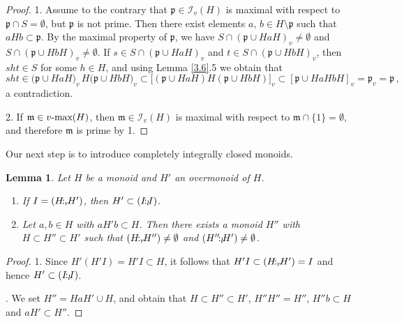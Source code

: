 \documentclass[a4paper]{amsart}
\newtheorem{lemma}[theorem]{Lemma}
\theoremstyle{definition}
\numberwithin{equation}{section}
\begin{document}
\begin{proof}
1. Assume to the contrary that $\mathfrak p \in \mathcal I_v(H)$ is
maximal with respect to $\mathfrak p \cap S = \emptyset$, but
$\mathfrak p$ is not prime. Then there exist elements $a,\,b \in H
\setminus \mathfrak p$ such that $aHb \subset \mathfrak p$. By the
maximal property of $\mathfrak p$, we have $S \cap (\mathfrak p \cup
HaH)_v \ne \emptyset$ and $S \cap (\mathfrak p \cup HbH)_v \ne
\emptyset$. If $s \in S \cap (\mathfrak p \cup HaH)_v$ and $t \in S
\cap (\mathfrak p\cup HbH)_v$, then $sht \in S$ for some $h \in H$,
and using Lemma \ref{3.6}.5 we obtain that
\[
sht \in \bigl( \mathfrak p\cup HaH \bigr)_v \, H \bigl(\mathfrak p
\cup HbH \bigr)_v \subset \bigl[(\mathfrak p\cup HaH) H (\mathfrak
p\cup HbH)\bigr]_v \subset [\mathfrak p \cup HaHbH]_v = \mathfrak
p_v = \mathfrak p\,,
\]
a contradiction.

\smallskip

2. If $\mathfrak m \in v\text{\rm -max}(H)$, then $\mathfrak m \in
\mathcal I_v(H)$ is maximal with respect to $\mathfrak m \cap \{1\}
= \emptyset$, and therefore $\mathfrak m$ is prime by 1.
\end{proof}

\smallskip
Our next step is to introduce completely integrally closed monoids.

\medskip
\begin{lemma} \label{3.9}
Let $H$ be a monoid and $H'$ an overmonoid of $H$.
\begin{enumerate}
\item If $I = (H {\negthinspace :_r \negthinspace} H')$, then $H' \subset (I {\negthinspace :_l \negthinspace} I)$.

\smallskip
\item Let $a, b \in H$ with $a H' b \subset H$. Then there exists a
      monoid $H''$ with $H \subset H'' \subset H'$ such that $(H {\negthinspace :_r \negthinspace} H'')
      \ne \emptyset$ and $(H'' {\negthinspace :_l \negthinspace} H') \ne \emptyset$.
\end{enumerate}
\end{lemma}

\begin{proof}
1. Since $H' (H' I) = H' I \subset H$, it follows that $H' I \subset
(H {\negthinspace :_r \negthinspace} H') = I$ and hence $H' \subset (I {\negthinspace :_l \negthinspace} I)$.

. We set $H'' = HaH' \cup H$, and obtain that $H \subset H''
\subset H'$, $H'' H'' = H''$, $H''b \subset H$ and $aH' \subset
H''$.
\end{proof}
\end{document}
